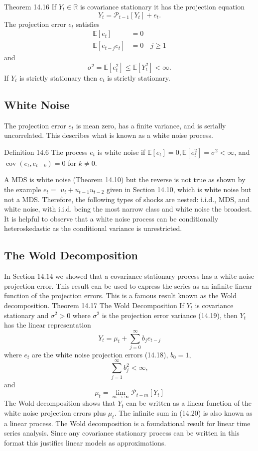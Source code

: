 \documentclass[10pt]{article}
\begin{document}
Theorem 14.16 If $Y_{t} \in \mathbb{R}$ is covariance stationary it has the projection equation
$$
Y_{t}=\mathscr{P}_{t-1}\left[Y_{t}\right]+e_{t} .
$$
The projection error $e_{t}$ satisfies
$$
\begin{aligned}
\mathbb{E}\left[e_{t}\right] &=0 \\
\mathbb{E}\left[e_{t-j} e_{t}\right] &=0 \quad j \geq 1
\end{aligned}
$$
and
$$
\sigma^{2}=\mathbb{E}\left[e_{t}^{2}\right] \leq \mathbb{E}\left[Y_{t}^{2}\right]<\infty .
$$
If $Y_{t}$ is strictly stationary then $e_{t}$ is strictly stationary.

\subsection{White Noise}
The projection error $e_{t}$ is mean zero, has a finite variance, and is serially uncorrelated. This describes what is known as a white noise process.

Definition 14.6 The process $e_{t}$ is white noise if $\mathbb{E}\left[e_{t}\right]=0, \mathbb{E}\left[e_{t}^{2}\right]=\sigma^{2}<\infty$, and $\operatorname{cov}\left(e_{t}, e_{t-k}\right)=0$ for $k \neq 0$.

A MDS is white noise (Theorem 14.10) but the reverse is not true as shown by the example $e_{t}=$ $u_{t}+u_{t-1} u_{t-2}$ given in Section 14.10, which is white noise but not a MDS. Therefore, the following types of shocks are nested: i.i.d., MDS, and white noise, with i.i.d. being the most narrow class and white noise the broadest. It is helpful to observe that a white noise process can be conditionally heteroskedastic as the conditional variance is unrestricted.

\subsection{The Wold Decomposition}
In Section $14.14$ we showed that a covariance stationary process has a white noise projection error. This result can be used to express the series as an infinite linear function of the projection errors. This is a famous result known as the Wold decomposition. Theorem 14.17 The Wold Decomposition If $Y_{t}$ is covariance stationary and $\sigma^{2}>0$ where $\sigma^{2}$ is the projection error variance (14.19), then $Y_{t}$ has the linear representation
$$
Y_{t}=\mu_{t}+\sum_{j=0}^{\infty} b_{j} e_{t-j}
$$
where $e_{t}$ are the white noise projection errors (14.18), $b_{0}=1$,
$$
\sum_{j=1}^{\infty} b_{j}^{2}<\infty,
$$
and
$$
\mu_{t}=\lim _{m \rightarrow \infty} \mathscr{P}_{t-m}\left[Y_{t}\right]
$$
The Wold decomposition shows that $Y_{t}$ can be written as a linear function of the white noise projection errors plus $\mu_{t}$. The infinite sum in (14.20) is also known as a linear process. The Wold decomposition is a foundational result for linear time series analysis. Since any covariance stationary process can be written in this format this justifies linear models as approximations.
\end{document}
